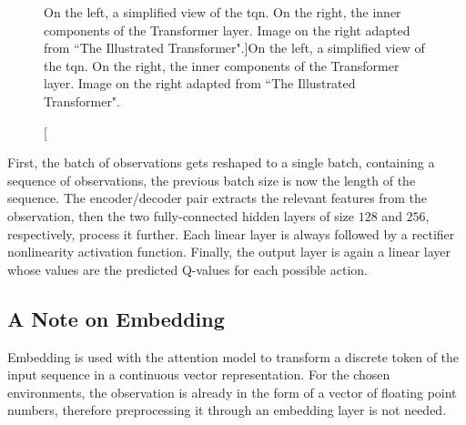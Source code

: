 \begin{figure}[H]
{{%
}%
}%
\hfill%
%
\caption[On the left, a simplified view of the \acrlong{tqn}. On the right, the inner components of the Transformer layer. Image on the right adapted from ``The Illustrated Transformer".]{On the left, a simplified view of the \acrlong{tqn}. On the right, the inner components of the Transformer layer. Image on the right adapted from ``The Illustrated Transformer"\protect\footnotemark.}
\label{fig:tqn-architecture}
\end{figure}



First, the batch of observations gets reshaped to a single batch, containing a sequence of observations, the previous batch size is now the length of the sequence. The encoder/decoder pair extracts the relevant features from the observation, then the two fully-connected hidden layers of size $128$ and $256$, respectively, process it further. Each linear layer is always followed by a rectifier nonlinearity activation function. Finally, the output layer is again a linear layer whose values are the predicted Q-values for each possible action.


\subsection{A Note on Embedding}
Embedding is used with the attention model to transform a discrete token of the input sequence in a continuous vector representation. For the chosen environments, the observation is already in the form of a vector of floating point numbers, therefore preprocessing it through an embedding layer is not needed.

